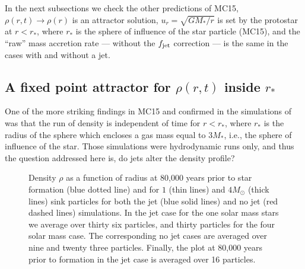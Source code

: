 \documentclass[../dissertation.tex]{subfiles}
\begin{document}
In the next subsections we check the other predictions of MC15, $\rho(r,t) \rightarrow \rho(r)$ is an attractor solution, $u_r = \sqrt{GM_* /r}$ is set by the protostar at $r<r_*$, where $r_*$ is the sphere of influence of the star particle (MC15), and the ``raw'' mass accretion rate --- without the $f_{\rm jet}$ correction ---  is the same in the cases with and without a jet.

\subsection{A fixed point attractor for $\rho(r,t)$ inside $r_*$} \label{sec:jet_run_density}

One of the more striking findings in MC15 and confirmed in the simulations of \citet{2017MNRAS.465.1316M} was that the run of density is independent of time for $r < r_*$, where $r_*$ is the radius of the sphere which encloses a gas mass equal to $3 M_*$, i.e., the sphere of influence of the star.
Those simulations were hydrodynamic runs only, and thus the question addressed here is, do jets alter the density profile?
%
\begin{figure}[htb] %
  \caption[Jet - Density profile for Jet Feedback]{Density $\rho$ as a function of radius at 80,000 years prior to star formation (blue dotted line) and for $1$ (thin lines) and $4 M_\odot$ (thick lines) sink particles for both the jet (blue solid lines) and no jet (red dashed lines) simulations. In the jet case for the one solar mass stars we average over thirty six particles, and thirty particles for the four solar mass case. The corresponding no jet cases are averaged over nine and twenty three particles. Finally, the plot at 80,000 years prior to formation in the jet case is averaged over 16 particles.
    }
    \label{fig:jet_ideal_density}
\end{figure}
%
\end{document}
